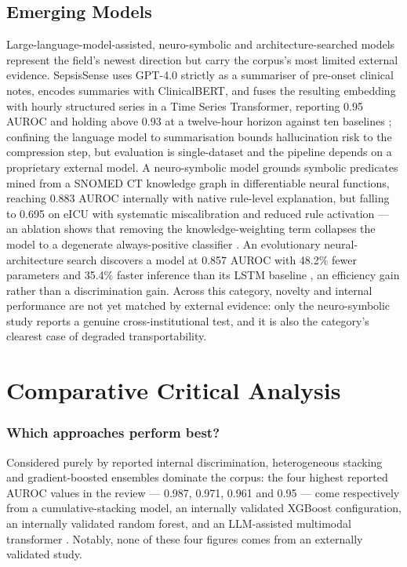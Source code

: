 \documentclass[conference]{IEEEtran}
\begin{document}
\subsection{Emerging Models}

Large-language-model-assisted, neuro-symbolic and architecture-searched models represent the field's newest direction but carry the corpus's most limited external evidence. SepsisSense uses GPT-4.0 strictly as a summariser of pre-onset clinical notes, encodes summaries with ClinicalBERT, and fuses the resulting embedding with hourly structured series in a Time Series Transformer, reporting 0.95 AUROC and holding above 0.93 at a twelve-hour horizon against ten baselines \cite{r22}; confining the language model to summarisation bounds hallucination risk to the compression step, but evaluation is single-dataset and the pipeline depends on a proprietary external model. A neuro-symbolic model grounds symbolic predicates mined from a SNOMED CT knowledge graph in differentiable neural functions, reaching 0.883 AUROC internally with native rule-level explanation, but falling to 0.695 on eICU with systematic miscalibration and reduced rule activation --- an ablation shows that removing the knowledge-weighting term collapses the model to a degenerate always-positive classifier \cite{r19}. An evolutionary neural-architecture search discovers a model at 0.857 AUROC with 48.2\% fewer parameters and 35.4\% faster inference than its LSTM baseline \cite{r31}, an efficiency gain rather than a discrimination gain. Across this category, novelty and internal performance are not yet matched by external evidence: only the neuro-symbolic study reports a genuine cross-institutional test, and it is also the category's clearest case of degraded transportability.

\section{Comparative Critical Analysis}

\subsubsection{Which approaches perform best?}

Considered purely by reported internal discrimination, heterogeneous stacking and gradient-boosted ensembles dominate the corpus: the four highest reported AUROC values in the review --- 0.987, 0.971, 0.961 and 0.95 --- come respectively from a cumulative-stacking model, an internally validated XGBoost configuration, an internally validated random forest, and an LLM-assisted multimodal transformer \cite{r15,r22,r30,r33}. Notably, none of these four figures comes from an externally validated study.
\end{document}
